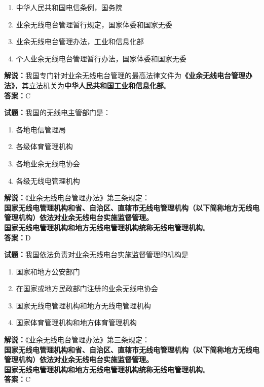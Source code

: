 \documentclass{ctexbook}
\begin{document}
\begin{enumerate}[leftmargin=3em]
	\item 中华人民共和国电信条例，国务院
	\item 业余无线电台管理暂行规定，国家体委和国家无委
	\item 业余无线电台管理办法，工业和信息化部
	\item 个人业余无线电台管理暂行办法，国家体委和国家无委
\end{enumerate}

\noindent\textbf{解说：}我国专门针对业余无线电台管理的最高法律文件为\textbf{《业余无线电台管理办法》}，其立法机关为\textbf{中华人民共和国工业和信息化部}。\\\noindent\textbf{答案：}C

\bigskip


\noindent\textbf{试题：}我国的无线电主管部门是：

\begin{enumerate}[leftmargin=3em]
	\item 各地电信管理局
	\item 各级体育管理机构
	\item 各地业余无线电协会
	\item 各级无线电管理机构
\end{enumerate}
\noindent\textbf{解说：}《业余无线电台管理办法》第三条规定：\\\textbf{国家无线电管理机构和省、自治区、直辖市无线电管理机构（以下简称地方无线电管理机构）依法对业余无线电台实施监督管理。\\
国家无线电管理机构和地方无线电管理机构统称无线电管理机构}。\\\noindent\textbf{答案：}D

\bigskip


\noindent\textbf{试题：}我国依法负责对业余无线电台实施监督管理的机构是

\begin{enumerate}[leftmargin=3em]
	\item 国家和地方公安部门
	\item 在国家或地方民政部门注册的业余无线电协会
	\item 国家无线电管理机构和地方无线电管理机构
	\item 国家体育管理机构和地方体育管理机构
\end{enumerate}

\noindent\textbf{解说：}《业余无线电台管理办法》第三条规定：\\\textbf{国家无线电管理机构和省、自治区、直辖市无线电管理机构（以下简称地方无线电管理机构）依法对业余无线电台实施监督管理。\\
国家无线电管理机构和地方无线电管理机构统称无线电管理机构}。\\\noindent\textbf{答案：}C
\end{document}
